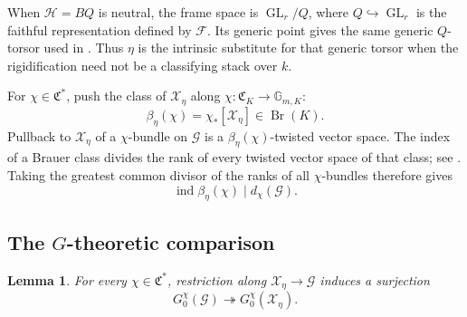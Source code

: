 \documentclass[11pt,reqno]{amsart}
\numberwithin{equation}{section}
\theoremstyle{plain}
\newtheorem{lemm}[prop]{Lemma}
\theoremstyle{definition}
\def\cG{{\mathcal G}}
\def\cH{{\mathcal H}}
\def\cX{{\mathcal X}}
\def\fC{{\mathfrak C}}
\def\Br{{\operatorname{Br}}}
\def\ind{{\operatorname{ind}}}
\def\GL{{\operatorname{GL}}}
\begin{document}
When $\cH=BQ$ is neutral, the frame space is $\GL_r/Q$, where
$Q\hookrightarrow\GL_r$ is the faithful representation defined by
$\mathcal F$.  Its generic point gives the same generic $Q$-torsor used in
\cite[Section~4, before Lemma~4.3]{KM}.  Thus $\eta$ is the intrinsic
substitute for that generic torsor when the rigidification need not be a
classifying stack over $k$.

For $\chi\in\fC^*$, push the class of $\cX_\eta$ along
$\chi:\fC_K\to\mathbb G_{m,K}$:
\[
\beta_\eta(\chi)=\chi_*[\cX_\eta]\in\Br(K).
\]
Pullback to $\cX_{\eta}$ of a $\chi$-bundle on $\cG$ is a
$\beta_\eta(\chi)$-twisted vector space.  The index of a Brauer class divides
the rank of every twisted vector space of that class; see
\cite[Proposition~3.1.2.1]{Lieblich2008}.  Taking the greatest common divisor of the
ranks of all $\chi$-bundles therefore gives
\begin{equation}\label{eq:index-divides-rank-ideal}
\ind\beta_\eta(\chi)\mid d_\chi(\cG).
\end{equation}

\subsection{The \texorpdfstring{$G$}{G}-theoretic comparison}

\begin{lemm}\label{lem:generic-central-g0-surjection}
For every $\chi\in\fC^*$, restriction along $\cX_\eta\to\cG$ induces a
surjection
\[
G_0^\chi(\cG)\twoheadrightarrow G_0^\chi(\cX_\eta).
\]
\end{lemm}
\end{document}
